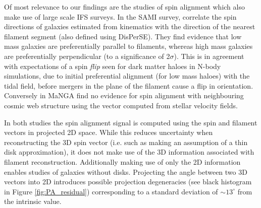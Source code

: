 
Of most relevance to our findings are the studies of spin alignment which also make use of large scale IFS surveys. In the SAMI survey, \citet{welker2020} correlate the spin directions of galaxies estimated from kinematics with the direction of the nearest filament segment (also defined using DisPerSE). They find evidence that low mass galaxies are preferentially parallel to filaments, whereas high mass galaxies are preferentially perpendicular (to a significance of 2$\sigma$). This is in agreement with expectations of a spin \textit{flip} seen for dark matter haloes in N-body simulations, due to initial preferential alignment (for low mass haloes) with the tidal field, before mergers in the plane of the filament cause a flip in orientation. Conversely in MaNGA \citet{krolewski2019} find no evidence for spin alignment with neighbouring cosmic web structure using the vector computed from stellar velocity fields. 

In both studies the spin alignment signal is computed using the spin and filament vectors in projected 2D space. While this reduces uncertainty when reconstructing the 3D spin vector (i.e. such as making an assumption of a thin disk approximation), it does not make use of the 3D information associated with filament reconstruction. Additionally making use of only the 2D information enables studies of galaxies without disks. Projecting the angle between two 3D vectors into 2D introduces possible projection degeneracies (see black histogram in Figure \ref{fig:PA_residual}) corresponding to a standard deviation of $\sim 13^{\circ}$ from the intrinsic value.


